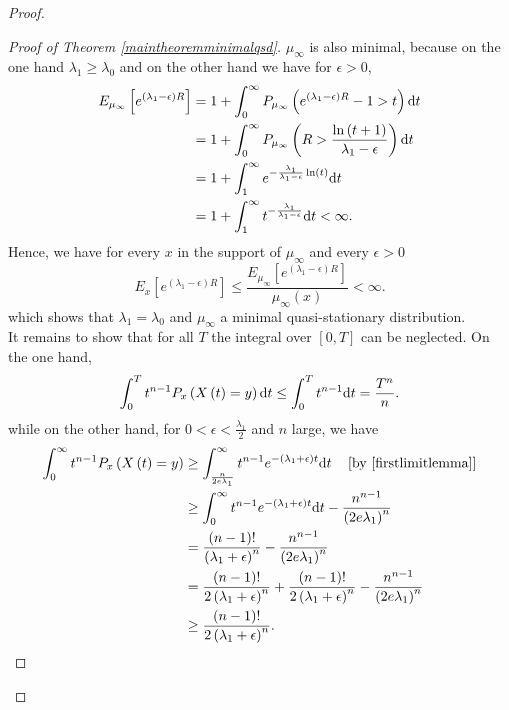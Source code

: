 \documentclass[12pt,a4paper]{scrartcl}
\numberwithin{equation}{section}
\begin{document}
\begin{proof}
\begin{proof}[Proof of Theorem \ref{maintheoremminimalqsd}]
$\mu_{\infty}$ is also minimal, because on the one hand $\lambda_1 \geq \lambda_0$ and on the other hand we have for $\epsilon > 0$,
\begin{align*}
E_{\mu_{\infty}}\left[e^{\left(\lambda_1-\epsilon\right)R} \right] &= 1 + \int_0^{\infty} P_{\mu_{\infty}}\left(e^{\left(\lambda_1-\epsilon\right)R}-1 > t\right) \textnormal{d}t \\
&=1+ \int_0^{\infty} P_{\mu_{\infty}} \left(R > \frac{\ln\left(t+1\right)}{\lambda_1-\epsilon} \right) \textnormal{d}t \\
&=1+\int_1^{\infty} e^{-\frac{\lambda_1}{\lambda_1-\epsilon}\ln\left(t\right)} \textnormal{d}t \\
&=1+\int_1^{\infty} t^{-\frac{\lambda_1}{\lambda_1-\epsilon}} \textnormal{d} t < \infty.
\end{align*}
Hence, we have for every $x$ in the support of $\mu_{\infty}$ and every $\epsilon > 0$
$$ E_x\left[e^{\left(\lambda_1-\epsilon\right)R}\right] \leq \frac{E_{\mu_{\infty}}\left[e^{\left(\lambda_1-\epsilon\right)R} \right]}{\mu_{\infty}\left(x\right)} < \infty. $$
which shows that $\lambda_1 = \lambda_0$ and $\mu_{\infty}$ a minimal quasi-stationary distribution.\\[2ex]

It remains to show that for all $T$ the integral over $\left[0,T\right]$ can be neglected. On the one hand,
\begin{equation}
\int_0^T t^{n-1} P_x\left(X\left(t\right) = y \right) \textnormal{d}t \leq \int_0^T t^{n-1} \textnormal{d}t = \frac{T^n}{n}.
\end{equation}
while on the other hand, for $0 < \epsilon < \frac{\lambda_1}{2}$ and $n$ large, we have
\begin{align*}
\int_0^{\infty} t^{n-1} P_x\left(X\left(t\right)=y \right) &\geq \int_{\frac{n}{2e\lambda_1}}^{\infty} t^{n-1} e^{-\left(\lambda_1 + \epsilon \right) t} \textnormal{d}t \quad \left[\textnormal{by \eqref{firstlimitlemma}} \right] \\
&\geq \int_0^{\infty} t^{n-1} e^{-\left(\lambda_1 + \epsilon \right) t } \textnormal{d}t - \frac{n^{n-1}}{\left(2e\lambda_1\right)^n} \\
&= \frac{\left(n-1\right)!}{\left(\lambda_1+\epsilon\right)^n} - \frac{n^{n-1}}{\left(2e\lambda_1\right)^n} \\
&= \frac{\left(n-1\right)!}{2\left(\lambda_1+\epsilon\right)^n} + \frac{\left(n-1\right)!}{2\left(\lambda_1+\epsilon\right)^n} - \frac{n^{n-1}}{\left(2e\lambda_1\right)^n} \\
&\geq \frac{\left(n-1\right)!}{2\left(\lambda_1+\epsilon\right)^n}.
\end{align*}


\end{proof}
\end{proof}
\end{document}

